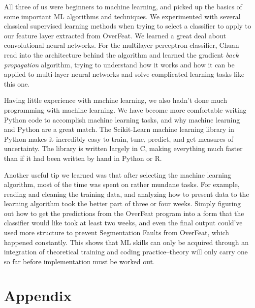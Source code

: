 \documentclass[12pt]{article}
\begin{document}
All three of us were beginners to machine learning, and picked up the basics of some important ML algorithms and techniques. We experimented with several classical supervised learning methods when trying to select a classifier to apply to our feature layer extracted from OverFeat.  We learned a great deal about convolutional neural networks. For the multilayer perceptron classifier, Chuan read into the architecture behind the algorithm and learned the gradient \emph{back propagation} algorithm, trying to understand how it works and how it can be applied to multi-layer neural networks and solve complicated learning tasks like this one.

Having little experience with machine learning, we also hadn't done much programming with machine learning. We have become more comfortable writing Python code to accomplish machine learning tasks, and why machine learning and Python are a great match. The Scikit-Learn machine learning library in Python makes it incredibly easy to train, tune, predict, and get measures of uncertainty. The library is written largely in C, making everything much faster than if it had been written by hand in Python or R.

Another useful tip we learned was that after selecting the machine learning algorithm, most of the time was spent on rather mundane tasks. For example, reading and cleaning the training data, and analyzing how to present data to the learning algorithm took the better part of three or four weeks. Simply figuring out how to get the predictions from the OverFeat program into a form that the classifier would like took at least two weeks, and even the final output could've used more structure to prevent Segmentation Faults from OverFeat, which happened constantly. This shows that ML skills can only be acquired through an integration of theoretical training and coding practice--theory will only carry one so far before implementation must be worked out.

\section{Appendix}
\end{document}
